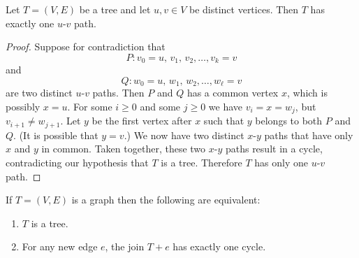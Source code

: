 \begin{theorem}
\label{thm:trees_forests:tree_has_one_u_v_path}
Let $T = (V,E)$ be a tree and let $u,v \in V$ be distinct
vertices. Then $T$ has exactly one $u$-$v$ path.
\end{theorem}

\begin{proof}
Suppose for contradiction that
\[
P : v_0 = u,\, v_1,\, v_2, \dots, v_k = v
\]
and
\[
Q : w_0 = u,\, w_1,\, w_2, \dots, w_\ell = v
\]
are two distinct $u$-$v$ paths. Then $P$ and $Q$ has a common vertex
$x$, which is possibly $x = u$. For some $i \geq 0$ and some
$j \geq 0$ we have $v_i = x = w_j$, but $v_{i+1} \neq w_{j+1}$. Let
$y$ be the first vertex after $x$ such that $y$ belongs to both $P$
and $Q$. (It is possible that $y = v$.) We now have two distinct
$x$-$y$ paths that have only $x$ and $y$ in common. Taken together,
these two $x$-$y$ paths result in a cycle, contradicting our
hypothesis that $T$ is a tree. Therefore $T$ has only one $u$-$v$ path.
\end{proof}

\begin{theorem}
If $T = (V,E)$ is a graph then the following are equivalent:
\begin{enumerate}
\item $T$ is a tree.

\item For any new edge $e$, the join $T + e$ has exactly
  one cycle.
\end{enumerate}
\end{theorem}


